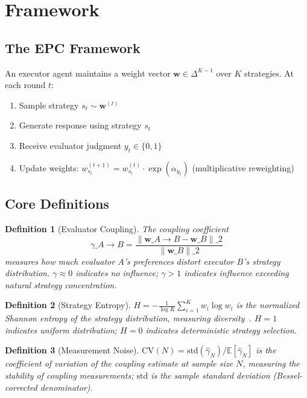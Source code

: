 \documentclass[11pt]{article}
\newtheorem{definition}{Definition}
\begin{document}
\section{Framework}

\subsection{The EPC Framework}

An executor agent maintains a weight vector $\mathbf{w} \in \Delta^{K-1}$ over $K$ strategies. At each round $t$:
\begin{enumerate}[leftmargin=*,nosep]
 \item Sample strategy $s_t \sim \mathbf{w}^{(t)}$
 \item Generate response using strategy $s_t$
 \item Receive evaluator judgment $y_t \in \{0, 1\}$
 \item Update weights: $w_{s_t}^{(t+1)} = w_{s_t}^{(t)} \cdot \exp(\alpha_{y_t})$ (multiplicative reweighting)
\end{enumerate}

\subsection{Core Definitions}

\begin{definition}[Evaluator Coupling]
The coupling coefficient
\[
\gamma\_{A \to B} =
\frac{\|\mathbf{w}\_{A \to B} - \mathbf{w}\_B\|\_2}{\|\mathbf{w}\_B\|\_2}
\]
measures how much evaluator $A$'s preferences distort executor $B$'s strategy distribution. $\gamma \approx 0$ indicates no influence; $\gamma > 1$ indicates influence exceeding natural strategy concentration.
\end{definition}

\begin{definition}[Strategy Entropy]
$H = -\frac{1}{\log K}\sum_{i=1}^K w_i \log w_i$ is the normalized Shannon entropy of the strategy distribution, measuring diversity~\cite{cover2012elements}. $H = 1$ indicates uniform distribution; $H = 0$ indicates deterministic strategy selection.
\end{definition}

\begin{definition}[Measurement Noise]
$\mathrm{CV}(N) = \text{std}(\hat{\gamma}_N) / \mathbb{E}[\hat{\gamma}_N]$ is the coefficient of variation of the coupling estimate at sample size $N$, measuring the stability of coupling measurements; $\text{std}$ is the sample standard deviation (Bessel-corrected denominator).
\end{definition}
\end{document}
